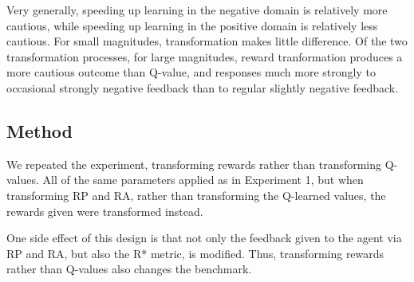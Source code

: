 Very generally, speeding up learning in the negative domain is relatively more cautious, while speeding up learning in the positive domain is relatively less cautious. For small magnitudes, transformation makes little difference. Of the two transformation processes, for large magnitudes, reward tranformation produces a more cautious outcome than Q-value, and responses much more strongly to occasional strongly negative feedback than to regular slightly negative feedback.








\subsection{Method}

We repeated the experiment, transforming rewards rather than transforming Q-values. All of the same parameters applied as in Experiment 1, but when transforming RP and RA, rather than transforming the Q-learned values, the rewards given were transformed instead.

One side effect of this design is that not only the feedback given to the agent via RP and RA, but also the R* metric, is modified. Thus, transforming rewards rather than Q-values also changes the benchmark.